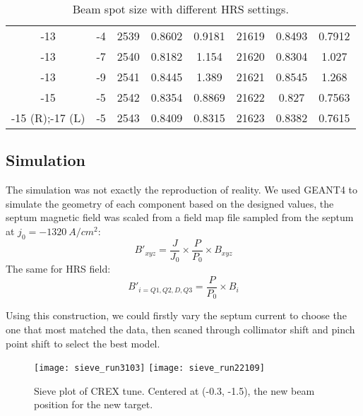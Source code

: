 \begin{table}[h!]
\begin{tabular}{c c | c c c | c c c}
	-13 & -4    & 2539  & 0.8602	& 0.9181    & 21619	& 0.8493    & 0.7912  \\
	-13 & -7    & 2540  & 0.8182	& 1.154	    & 21620	& 0.8304    & 1.027   \\
	-13 & -9    & 2541  & 0.8445	& 1.389	    & 21621	& 0.8545    & 1.268   \\
	-15 & -5    & 2542  & 0.8354	& 0.8869    & 21622	& 0.827	    & 0.7563  \\
	\hline
	-15 (R);-17 (L)	& -5	&2543	& 0.8409	& 0.8315  & 21623 & 0.8382	& 0.7615  \\
	\hline
    \end{tabular}
    \caption{Beam spot size with different HRS settings.}
\end{table}

\subsection{Simulation}
The simulation was not exactly the reproduction of reality. We used GEANT4 to
simulate the geometry of each component based on the designed values, the
septum magnetic field was scaled from a field map file sampled from the septum
at $j_0 = -1320\ A/cm^2$: %
\begin{equation}
    B'_{xyz} = \frac{J}{J_0} \times \frac{P}{P_0} \times B_{xyz}
\end{equation}
The same for HRS field: %
\begin{equation}
    B'_{i = Q1, Q2, D, Q3} = \frac{P}{P_0} \times B_i
\end{equation}

Using this construction, we could firstly vary the septum current to choose the
one that most matched the data, then scaned through collimator shift and pinch point
shift to select the best model.

\begin{figure}[H]
    \texttt{[image: sieve\_run3103]}
    \texttt{[image: sieve\_run22109]}
    \caption{Sieve plot of CREX tune. Centered at (-0.3, -1.5), the new beam 
    position for the new target.}
\end{figure}

